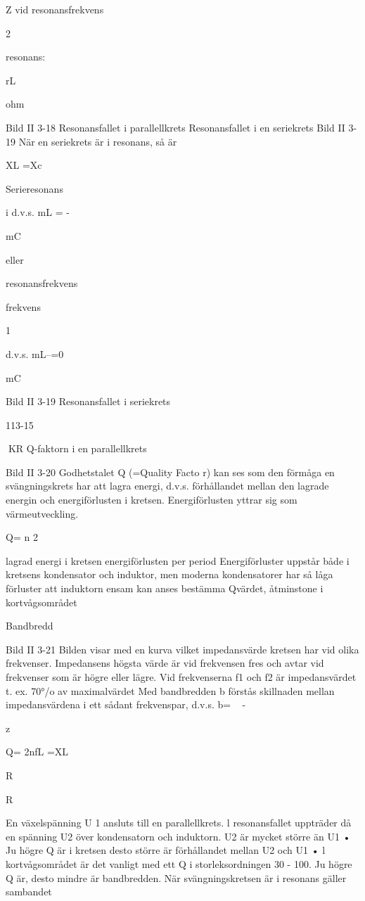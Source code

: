 {{Z vid
resonansfrekvens

2

resonans:

rL

ohm

Bild II 3-18 Resonansfallet i parallellkrets
Resonansfallet i en seriekrets
Bild II 3-19
När en seriekrets är i resonans, så är

XL =Xc

Serieresonans

i
d.v.s. mL = -

mC

eller

resonansfrekvens

frekvens

1

d.v.s. mL--=0

mC

Bild II 3-19 Resonansfallet i seriekrets

113-15

KR
Q-faktorn i en parallellkrets

Bild II 3-20
Godhetstalet Q (=Quality Facto r) kan ses
som den förmåga en svängningskrets har att
lagra energi, d.v.s. förhållandet mellan den
lagrade energin och energiförlusten i kretsen. Energiförlusten yttrar sig som värmeutveckling.

Q= n
2

lagrad energi i kretsen
energiförlusten per period
Energiförluster uppstår både i kretsens
kondensator och induktor, men moderna
kondensatorer har så låga förluster att
induktorn ensam kan anses bestämma Qvärdet, åtminstone i kortvågsområdet

Bandbredd

Bild II 3-21
Bilden visar med en kurva vilket impedansvärde kretsen har vid olika frekvenser.
Impedansens högsta värde är vid frekvensen fres och avtar vid frekvenser som är högre
eller lägre. Vid frekvenserna f1 och f2 är
impedansvärdet t. ex. 70°/o av maximalvärdet
Med bandbredden b förstås skillnaden mellan impedansvärdena i ett sådant frekvenspar, d.v.s. b= ~ - ~

z

Q= 2nfL =XL

R

R

En växelspänning U 1 ansluts till en
parallellkrets. l resonansfallet uppträder då
en spänning U2 över kondensatorn och
induktorn.
U2 är mycket större än U1 • Ju högre Q är
i kretsen desto större är förhållandet mellan
U2 och U1 •
l kortvågsområdet är det vanligt med ett
Q i storleksordningen 30 - 100.
Ju högre Q är, desto mindre är bandbredden.
När svängningskretsen är i resonans gäller sambandet

}}

